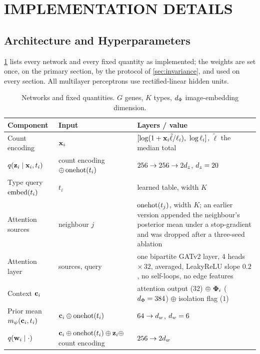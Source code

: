 \section{IMPLEMENTATION DETAILS}
\label{app:implementation}

\subsection{Architecture and Hyperparameters}
\label{app:architecture}

\cref{tab:architecture} lists every network and every fixed quantity as implemented; the weights are set once, on the primary section, by the protocol of \cref{sec:invariance}, and used on every section. All multilayer perceptrons use rectified-linear hidden units.

\begin{table}[t]
\centering
\caption{ Networks and fixed quantities. $G$ genes, $K$ types, $d_{\Phi}$ image-embedding dimension.}
\label{tab:architecture}
\small
\begin{tabular}{@{}p{}p{}p{}@{}}
\toprule
Component & Input & Layers / value \\
\midrule
Count encoding & $\mathbf{x}_i$ & $[\log(1 + \mathbf{x}_i \tilde\ell/\ell_i),\ \log\ell_i]$, $\tilde\ell$ the median total \\
$q(\mathbf{z}_i \mid \mathbf{x}_i, t_i)$ & count encoding $\oplus \operatorname{onehot}(t_i)$ & $256 \to 256 \to 2d_z$, $d_z = 20$ \\
Type query $\operatorname{embed}(t_i)$ & $t_i$ & learned table, width $K$ \\
Attention sources & neighbour $j$ & $\operatorname{onehot}(t_j)$, width $K$; an earlier version appended the neighbour's posterior mean under a stop-gradient and was dropped after a three-seed ablation \\
Attention layer & sources, query & one bipartite GATv2 layer, $4$ heads $\times\, 32$, averaged, LeakyReLU slope $0.2$, no self-loops, no edge features \\
Context $\mathbf{c}_i$ & & attention output ($32$) $\oplus\ \boldsymbol{\Phi}_i$ ($d_{\Phi} = 384$) $\oplus$ isolation flag ($1$) \\
Prior mean $m_{\psi}(\mathbf{c}_i, t_i)$ & $\mathbf{c}_i \oplus \operatorname{onehot}(t_i)$ & $64 \to d_w$, $d_w = 6$ \\
$q(\mathbf{w}_i \mid \cdot)$ & $\mathbf{c}_i \oplus \operatorname{onehot}(t_i) \oplus \mathbf{z}_i \oplus$ count encoding & $256 \to 2d_w$ \\

\end{tabular}
\end{table}
